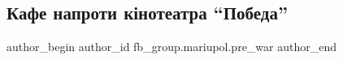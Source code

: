  
 
 
 
 

\subsection{Кафе напроти кінотеатра \enquote{Победа}}
\label{sec:04_02_2023.fb.fb_group.mariupol.pre_war.7.kafe_naproti_k_notea}

\ifcmt
 author_begin
   author_id fb_group.mariupol.pre_war
 author_end
\fi

